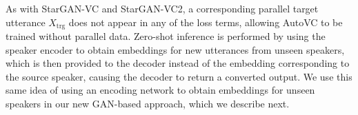 As with StarGAN-VC and StarGAN-VC2, a corresponding parallel target utterance $X_\text{trg}$ does not appear in any of the loss terms, allowing AutoVC to be trained without parallel data. 
Zero-shot inference is performed by using the speaker encoder to obtain embeddings for new utterances from unseen speakers, which is then provided to the decoder instead of the embedding corresponding to the source speaker, causing the decoder to return a converted output. 
We use this same idea of using an encoding network to obtain embeddings for unseen speakers in our new GAN-based approach, which we describe next.

